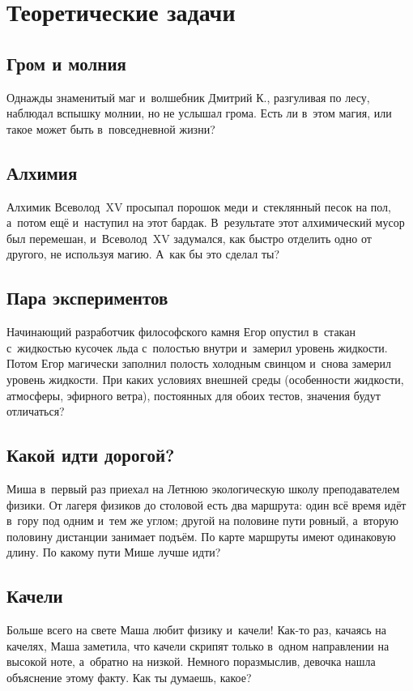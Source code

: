 \documentclass[a4paper,12pt]{article}
\begin{document}
\section{Теоретические задачи}

\subsection{Гром и молния}
Однажды знаменитый маг и~волшебник Дмитрий К., разгуливая по лесу, наблюдал вспышку молнии,
но не услышал грома. Есть ли в~этом магия, или такое может быть в~повседневной жизни?

\subsection{Алхимия}
Алхимик Всеволод~XV просыпал порошок меди и~стеклянный песок на пол, а~потом ещё
и~наступил на этот бардак. В~результате этот алхимический мусор был перемешан,
и~Всеволод~XV задумался, как быстро отделить одно от другого, не используя магию.
А~как бы это сделал ты?

\subsection{Пара экспериментов}
Начинающий разработчик философского камня Егор опустил в~стакан с~жидкостью кусочек
льда с~полостью внутри и~замерил уровень жидкости. Потом Егор магически заполнил
полость холодным свинцом и~снова замерил уровень жидкости. При каких условиях
внешней среды (особенности жидкости, атмосферы, эфирного ветра), постоянных
для обоих тестов, значения будут отличаться?

\subsection{Какой идти дорогой?}
Миша в~первый раз приехал на Летнюю экологическую школу преподавателем физики.
От лагеря физиков до столовой есть два маршрута: один всё время идёт в~гору
под одним и~тем же углом; другой на половине пути ровный, а~вторую половину
дистанции занимает подъём. По карте маршруты имеют одинаковую длину.
По какому пути Мише лучше идти?

\subsection{Качели}
Больше всего на свете Маша любит физику и~качели! Как-то раз, качаясь на качелях,
Маша заметила, что качели скрипят только в~одном направлении на высокой ноте,
а~обратно на низкой. Немного поразмыслив, девочка нашла объяснение этому факту.
Как ты думаешь, какое?
\end{document}
